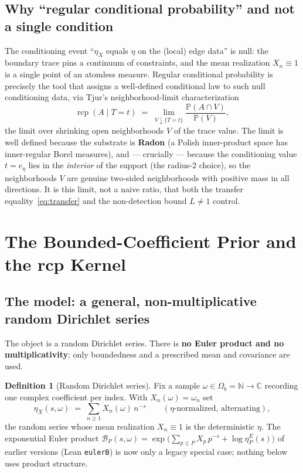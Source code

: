 \documentclass[11pt,a4paper]{article}
\theoremstyle{definition}
\newtheorem{definition}[theorem]{Definition}
\newcommand{\etaX}{\eta_X}
\newcommand{\rcp}{\operatorname{rcp}}
\begin{document}
\subsection{Why ``regular conditional probability'' and not a single condition}

The conditioning event ``\(\etaX\) equals \(\eta\) on the (local) edge data'' is null: the
boundary trace pins a continuum of constraints, and the mean realization \(X_n\equiv1\) is
a single point of an atomless measure. Regular conditional probability is precisely the
tool that assigns a well-defined conditional law to such null conditioning data, via
Tjur's neighborhood-limit characterization
\begin{equation}\label{eq:tjur}
  \rcp(A \mid T = t)
  \;=\; \lim_{V \downarrow \{T=t\}} \frac{\mathbb{P}(A \cap V)}{\mathbb{P}(V)},
\end{equation}
the limit over shrinking open neighborhoods \(V\) of the trace value. The limit is well
defined because the substrate is \textbf{Radon} (a Polish inner-product space has
inner-regular Borel measures), and --- crucially --- because the conditioning value
\(t=e_\eta\) lies in the \emph{interior} of the support (the radius-\(2\) choice), so the
neighborhoods \(V\) are genuine two-sided neighborhoods with positive mass in all
directions. It is this limit, not a naive ratio, that both the transfer
equality~\eqref{eq:transfer} and the non-detection bound \(L\neq1\) control.

\section{The Bounded-Coefficient Prior and the rcp Kernel}

\subsection{The model: a general, non-multiplicative random Dirichlet series}\label{sec:model}

The object is a random Dirichlet series. There is \textbf{no Euler product and no
multiplicativity}; only boundedness and a prescribed mean and covariance are used.

\begin{definition}[Random Dirichlet series]\label{def:series}
Fix a sample \(\omega\in\Omega_b=\mathbb{N}\to\mathbb{C}\) recording one complex
coefficient per index. With \(X_n(\omega)=\omega_n\) set
\[
  \etaX(s,\omega) \;=\; \sum_{n\ge 1} X_n(\omega)\,n^{-s}
  \qquad(\eta\text{-normalized, alternating}),
\]
the random series whose mean realization \(X_n\equiv1\) is the deterministic \(\eta\). The
exponential Euler product \(\mathcal{B}_P(s,\omega)=\exp\bigl(\sum_{p\le P}X_p\,p^{-s}
+\log\eta^E_P(s)\bigr)\) of earlier versions (Lean \texttt{eulerB}) is now only a legacy
special case; nothing below uses product structure.
\end{definition}
\end{document}
